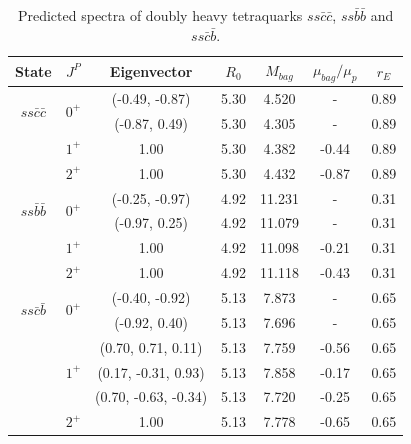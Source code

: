 \documentclass[prd,twocolumn,floatfix,nofootinbib]{revtex4}
\begin{document}
\renewcommand{\tabcolsep}{0.83cm}
\renewcommand{\arraystretch}{1.2}
\begin{table}[!htbp]
    \caption{Predicted spectra of doubly heavy tetraquarks $ss\bar{c}\bar{c}$, $ss\bar{b}\bar{b}$ and $ss\bar{c}\bar{b}$.}
    \label{tab:2heavytetraquark0}
    \begin{tabular}{ccccccc}
        \hline\hline
        {\rm State}     &$J^{P}$    &{\rm Eigenvector}      &$R_{0}$    &$M_{bag}$  &$\mu_{bag}/\mu_{p}$    &$r_{E}$ \\ \hline
        \multirow{2}{*}{$ss\bar{c}\bar{c}$}
                        &\multirow{2}{*}{$0^{+}$}
                                    &(-0.49, -0.87)         &5.30	    &4.520	    &-                      &0.89 \\ 
                        &           &(-0.87, 0.49)          &5.30	    &4.305	    &-                      &0.89 \\ 
                        &$1^{+}$    &1.00                   &5.30	    &4.382	    &-0.44                  &0.89 \\ 
                        &$2^{+}$    &1.00                   &5.30	    &4.432	    &-0.87                  &0.89 \\ 
        \multirow{2}{*}{$ss\bar{b}\bar{b}$}
                        &\multirow{2}{*}{$0^{+}$}
                                    &(-0.25, -0.97)         &4.92	    &11.231	    &-                      &0.31 \\ 
                        &           &(-0.97, 0.25)          &4.92	    &11.079	    &-                      &0.31 \\ 
                        &$1^{+}$    &1.00                   &4.92	    &11.098	    &-0.21                  &0.31 \\ 
                        &$2^{+}$    &1.00                   &4.92	    &11.118	    &-0.43                  &0.31 \\ 
        \multirow{2}{*}{$ss\bar{c}\bar{b}$}
                        &\multirow{2}{*}{$0^{+}$}
                                    &(-0.40, -0.92)         &5.13	    &7.873	    &-                      &0.65 \\ 
                        &           &(-0.92, 0.40)          &5.13	    &7.696	    &-                      &0.65 \\ 
                        &\multirow{3}{*}{$1^{+}$}
                                    &(0.70, 0.71, 0.11)     &5.13	    &7.759	    &-0.56                  &0.65 \\ 
                        &           &(0.17, -0.31, 0.93)    &5.13	    &7.858	    &-0.17                  &0.65 \\ 
                        &           &(0.70, -0.63, -0.34)   &5.13	    &7.720	    &-0.25                  &0.65 \\ 
                        &$2^{+}$    &1.00                   &5.13	    &7.778	    &-0.65                  &0.65 \\ 
        \hline\hline
    \end{tabular}
\end{table}
\end{document}
